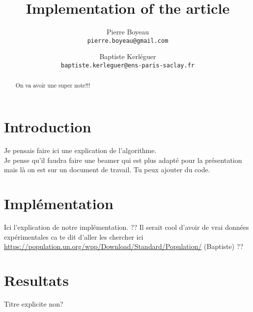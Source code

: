 \documentclass[10pt,twocolumn,letterpaper]{article}
\begin{document}
\title{Implementation of the article \cite{Girolami2011}}

\author{Pierre Boyeau\\
{\tt\small pierre.boyeau@gmail.com}
\and
Baptiste Kerl\'eguer\\
{\tt\small baptiste.kerleguer@ens-paris-saclay.fr}
}

\maketitle

\begin{abstract}
On va avoir une super note!!!
\end{abstract}

\section{Introduction}
Je pensais faire ici une explication de l'algorithme.\\
Je pense qu'il faudra faire une beamer qui est plus adapté pour la présentation mais là on est sur un document de travail. Tu peux ajouter du code. 
\section{Impl\'ementation}
Ici l'explication de notre impl\'ementation. ?? Il serait cool d'avoir de vrai données expérimentales ca te dit d'aller les chercher ici \url{https://population.un.org/wpp/Download/Standard/Population/} (Baptiste) ??
\section{Resultats}
Titre explicite non?
{\small


}
\end{document}
